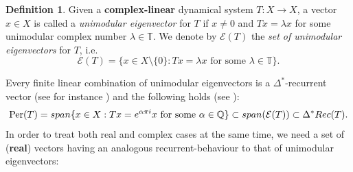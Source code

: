 \documentclass[openright,11pt]{article}
\theoremstyle{plain}
\theoremstyle{definition}
\newtheorem{definition}[theorem]{Definition}
\newcommand{\QQ}{\mathbb{Q}}
\newcommand{\TT}{\mathbb{T}}
\newcommand{\Del}{\Delta}
\newcommand{\Ec}{\mathcal{E}}
\newcommand{\Per}{\operatorname{Per}}
\newcommand{\Rec}{\textup{Rec}}
\newcommand{\lspan}{\textup{span}}
\begin{document}
\begin{definition}
	Given a \textbf{complex-linear} dynamical system $T:X\longrightarrow X$, a vector $x \in X$ is called a {\em unimodular eigenvector} for $T$ if $x \neq 0$ and $Tx=\lambda x$ for some unimodular complex number $\lambda \in \TT$. We denote by $\Ec(T)$ the {\em set of unimodular eigenvectors} for $T$, i.e.\
	\[
	\Ec(T) = \{ x \in X\setminus\{0\} : Tx = \lambda x \text{ for some } \lambda \in \TT \}.
	\]
\end{definition}
	
Every finite linear combination of unimodular eigenvectors is a $\Del^*$-recurrent vector (see for instance \cite[Proposition 4.1]{GriLo2023}) and the following holds (see \cite[Proposition~2.33]{GrPe2011_book}):
\[
\Per(T) = \lspan\{ x \in X : Tx = e^{\alpha \pi i}x \text{ for some } \alpha \in \QQ \} \subset \lspan(\Ec(T)) \subset \Del^*\Rec(T).
\]
In order to treat both real and complex cases at the same time, we need a set of (\textbf{real}) vectors having an analogous recurrent-behaviour to that of unimodular eigenvectors:
\end{document}
